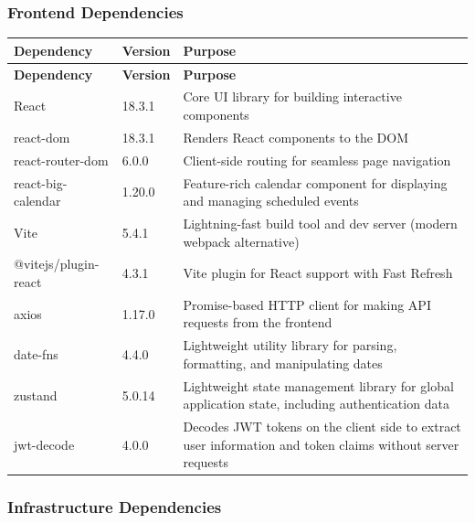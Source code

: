 \subsubsection{Frontend Dependencies}

\begin{longtable}{L{3.6cm} C{2.0cm} L{8.8cm}}
  \color{white}\bfseries Dependency &
  \color{white}\bfseries Version &
  \color{white}\bfseries Purpose \\
  \endfirsthead
  \color{white}\bfseries Dependency &
  \color{white}\bfseries Version &
  \color{white}\bfseries Purpose \\
  \endhead
  React & 18.3.1 & Core UI library for building interactive components \\
  react-dom & 18.3.1 & Renders React components to the DOM \\
  react-router-dom & 6.0.0 & Client-side routing for seamless page navigation \\
  react-big-calendar & 1.20.0 & Feature-rich calendar component for displaying and managing scheduled events \\
  Vite & 5.4.1 & Lightning-fast build tool and dev server (modern webpack alternative) \\
  @vitejs/plugin-react & 4.3.1 & Vite plugin for React support with Fast Refresh \\
  axios & 1.17.0 & Promise-based HTTP client for making API requests from the frontend \\
  date-fns & 4.4.0 & Lightweight utility library for parsing, formatting, and manipulating dates \\
  zustand & 5.0.14 & Lightweight state management library for global application state, including authentication data \\
  jwt-decode & 4.0.0 & Decodes JWT tokens on the client side to extract user information and token claims without server requests \\
\end{longtable}
\subsubsection{Infrastructure Dependencies}

